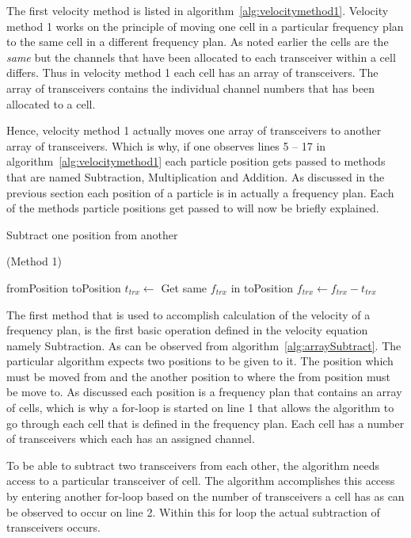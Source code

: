 The first velocity method is listed in algorithm~\ref{alg:velocitymethod1}. Velocity method 1 works on the principle of moving one cell in a particular frequency plan to the same cell in a different frequency plan. As noted earlier the cells are the \emph{same} but the channels that have been allocated to each transceiver within a cell differs. Thus in velocity method 1 each cell has an array of transceivers. The array of transceivers contains the individual channel numbers that has been allocated to a cell.

Hence, velocity method 1 actually moves one array of transceivers to another array of transceivers. Which is why, if one observes lines 5 -- 17 in algorithm~\ref{alg:velocitymethod1} each particle position gets passed to methods that are named Subtraction, Multiplication and Addition. As discussed in the previous section each position of a particle is in actually a frequency plan. Each of the methods particle positions get passed to will now be briefly explained.

\begin{algorithm}
\caption{Subtract one position from another} (Method 1)
\label{alg:arraySubtract}
\begin{algorithmic}[1]
	\REQUIRE fromPosition
	\REQUIRE toPosition
			\STATE $t_{trx} \leftarrow$ Get same $f_{trx}$ in toPosition
			\STATE $f_{trx} \leftarrow f_{trx} - t_{trx}$
		\ENDFOR
	\ENDFOR
\end{algorithmic}
\end{algorithm}

The first method that is used to accomplish calculation of the velocity of a frequency plan, is the first basic operation defined in the velocity equation namely Subtraction. As can be observed from algorithm~\ref{alg:arraySubtract}. The particular algorithm expects two positions to be given to it. The position which must be moved from and the another position to where the from position must be move to. As discussed each position is a frequency plan that contains an array of cells, which is why a for-loop is started on line 1 that allows the algorithm to go through each cell that is defined in the frequency plan. Each cell has a number of transceivers which each has an assigned channel. 

To be able to subtract two transceivers from each other, the algorithm needs access to a particular transceiver of cell. The algorithm accomplishes this access by entering another for-loop based on the number of transceivers a cell has as can be observed to occur on line 2. Within this for loop the actual subtraction of transceivers occurs.

